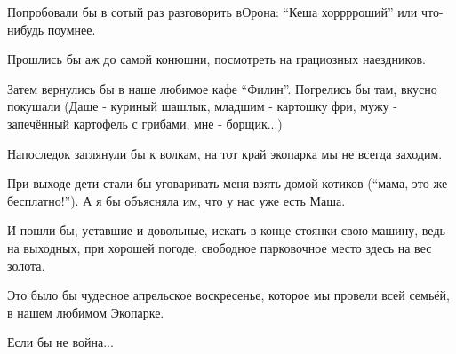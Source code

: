 Попробовали бы в сотый раз разговорить вОрона: \enquote{Кеша хорррроший} или что-нибудь
поумнее.

Прошлись бы аж до самой конюшни, посмотреть на грациозных наездников. 

Затем вернулись бы в наше любимое кафе \enquote{Филин}. Погрелись бы там, вкусно
покушали (Даше - куриный шашлык, младшим - картошку фри, мужу - запечённый
картофель с грибами, мне - борщик...) 


Напоследок заглянули бы к волкам, на тот край экопарка мы не всегда заходим. 

При выходе дети стали бы уговаривать меня взять домой котиков (\enquote{мама, это же
бесплатно!}). А я бы объясняла им, что у нас уже есть Маша.

И пошли бы, уставшие и довольные, искать в конце стоянки свою машину, ведь на
выходных, при хорошей погоде, свободное парковочное место здесь на вес золота.

Это было бы чудесное апрельское воскресенье, которое мы провели всей семьёй, в
нашем любимом Экопарке. 

Если бы не война...

